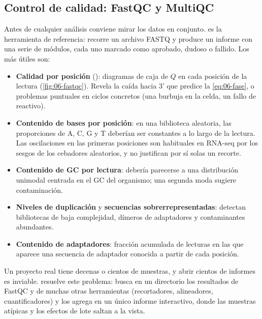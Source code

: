 \subsection{Control de calidad: FastQC y MultiQC}

Antes de cualquier análisis conviene mirar los datos en conjunto.  \parencite{c06-andrews2010} es la herramienta de referencia: recorre un archivo FASTQ y produce un informe con una serie de módulos, cada uno marcado como aprobado, dudoso o fallido. Los más útiles son:

\begin{itemize}
  \item \textbf{Calidad por posición} (): diagramas de caja de $Q$ en cada posición de la lectura (\cref{fig:06-fastqc}). Revela la caída hacia 3' que predice la \cref{eq:06-fase}, o problemas puntuales en ciclos concretos (una burbuja en la celda, un fallo de reactivo).
  \item \textbf{Contenido de bases por posición}: en una biblioteca aleatoria, las proporciones de A, C, G y T deberían ser constantes a lo largo de la lectura. Las oscilaciones en las primeras posiciones son habituales en RNA-seq por los sesgos de los cebadores aleatorios, y no justifican por sí solas un recorte.
  \item \textbf{Contenido de GC por lectura}: debería parecerse a una distribución unimodal centrada en el GC del organismo; una segunda moda sugiere contaminación.
  \item \textbf{Niveles de duplicación} y \textbf{secuencias sobrerrepresentadas}: detectan bibliotecas de baja complejidad, dímeros de adaptadores y contaminantes abundantes.
  \item \textbf{Contenido de adaptadores}: fracción acumulada de lecturas en las que aparece una secuencia de adaptador conocida a partir de cada posición.
\end{itemize}

Un proyecto real tiene decenas o cientos de muestras, y abrir cientos de informes es inviable.  \parencite{c06-ewels2016} resuelve este problema: busca en un directorio los resultados de FastQC y de muchas otras herramientas (recortadores, alineadores, cuantificadores) y los agrega en un único informe interactivo, donde las muestras atípicas y los efectos de lote saltan a la vista.

